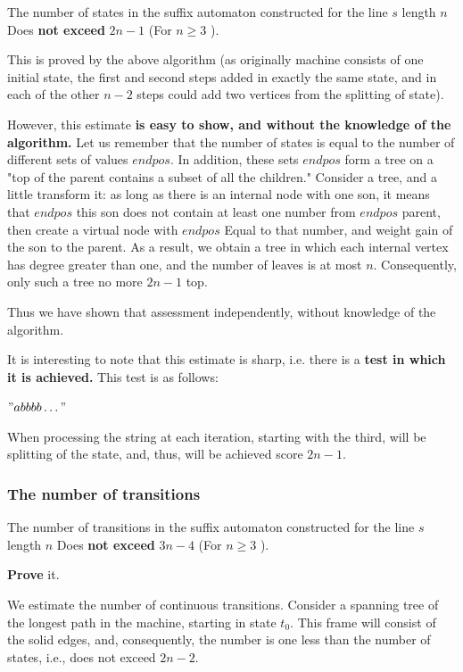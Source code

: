 The number of states in the suffix automaton constructed for the line $s$ length $n$ Does \textbf{not exceed} \textbf{$2n-1$} (For $n \ge 3$ ).

This is proved by the above algorithm (as originally machine consists of one initial state, the first and second steps added in exactly the same state, and in each of the other $n-2$ steps could add two vertices from the splitting of state).

However, this estimate \textbf{is easy to show, and without the knowledge of the algorithm.} Let us remember that the number of states is equal to the number of different sets of values $endpos$. In addition, these sets $endpos$ form a tree on a "top of the parent contains a subset of all the children." Consider a tree, and a little transform it: as long as there is an internal node with one son, it means that $endpos$ this son does not contain at least one number from $endpos$ parent, then create a virtual node with $endpos$ Equal to that number, and weight gain of the son to the parent. As a result, we obtain a tree in which each internal vertex has degree greater than one, and the number of leaves is at most $n$. Consequently, only such a tree no more $2n-1$ top.

Thus we have shown that assessment independently, without knowledge of the algorithm.

It is interesting to note that this estimate is sharp, i.e. there is a \textbf{test in which it is achieved.} This test is as follows:

$" abbbb \ldots " $

When processing the string at each iteration, starting with the third, will be splitting of the state, and, thus, will be achieved score $2n-1$.

\subsubsection{ The number of transitions }

The number of transitions in the suffix automaton constructed for the line $s$ length $n$ Does \textbf{not exceed} \textbf{$3n-4$} (For $n \ge 3$ ).

\textbf{Prove} it.

We estimate the number of continuous transitions. Consider a spanning tree of the longest path in the machine, starting in state $t_0$. This frame will consist of the solid edges, and, consequently, the number is one less than the number of states, i.e., does not exceed $2n-2$.

